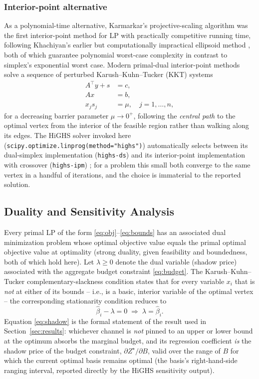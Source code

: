 \documentclass[conference]{IEEEtran}
\begin{document}
\subsubsection{Interior-point alternative}
As a polynomial-time alternative, Karmarkar's projective-scaling algorithm \cite{karmarkar_1984} was the first interior-point method for LP with practically competitive running time, following Khachiyan's earlier but computationally impractical ellipsoid method \cite{khachiyan_1979}, both of which guarantee polynomial worst-case complexity in contrast to simplex's exponential worst case. Modern primal-dual interior-point methods solve a sequence of perturbed Karush--Kuhn--Tucker (KKT) systems
\begin{equation}
\begin{aligned}
A^\top y + s &= c, \\
Ax &= b, \\
x_j s_j &= \mu, \quad j=1,\dots,n,
\end{aligned}
\end{equation}
for a decreasing barrier parameter $\mu \to 0^+$, following the \emph{central path} to the optimal vertex from the interior of the feasible region rather than walking along its edges. The HiGHS solver invoked here (\texttt{scipy.optimize.linprog(method="highs")}) automatically selects between its dual-simplex implementation (\texttt{highs-ds}) and its interior-point implementation with crossover (\texttt{highs-ipm}) \cite{huangfu_hall_2018}; for a problem this small both converge to the same vertex in a handful of iterations, and the choice is immaterial to the reported solution.

\subsection{Duality and Sensitivity Analysis}
Every primal LP of the form \eqref{eq:obj}--\eqref{eq:bounds} has an associated dual minimization problem whose optimal objective value equals the primal optimal objective value at optimality (strong duality, given feasibility and boundedness, both of which hold here). Let $\lambda \ge 0$ denote the dual variable (shadow price) associated with the aggregate budget constraint \eqref{eq:budget}. The Karush--Kuhn--Tucker complementary-slackness condition states that for every variable $x_i$ that is \emph{not} at either of its bounds -- i.e., is a basic, interior variable of the optimal vertex -- the corresponding stationarity condition reduces to
\begin{equation}
\hat\beta_i - \lambda = 0 \;\Longrightarrow\; \lambda = \hat\beta_i.
\label{eq:shadow}
\end{equation}
Equation \eqref{eq:shadow} is the formal statement of the result used in Section~\ref{sec:results}: whichever channel is \emph{not} pinned to an upper or lower bound at the optimum absorbs the marginal budget, and its regression coefficient \emph{is} the shadow price of the budget constraint, $\partial Z^\star/\partial B$, valid over the range of $B$ for which the current optimal basis remains optimal (the basis's right-hand-side ranging interval, reported directly by the HiGHS sensitivity output).
\end{document}
